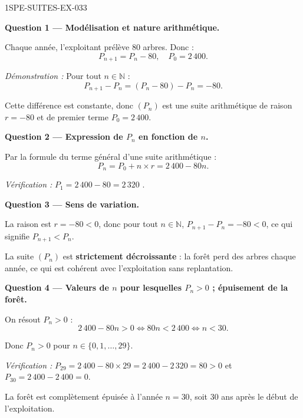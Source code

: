 \begin{corrige}{1SPE-SUITES-EX-033}

\textbf{Question 1 — Modélisation et nature arithmétique.}

Chaque année, l'exploitant prélève $80$ arbres. Donc :
\[
  P_{n+1} = P_n - 80, \quad P_0 = 2\,400.
\]

\textit{Démonstration :} Pour tout $n \in \mathbb{N}$ :
\[
  P_{n+1} - P_n = (P_n - 80) - P_n = -80.
\]


Cette différence est constante, donc $(P_n)$ est une suite arithmétique de raison $r = -80$ et de premier terme $P_0 = 2\,400$.

\medskip
\textbf{Question 2 — Expression de $P_n$ en fonction de $n$.}

Par la formule du terme général d'une suite arithmétique :
\[
  P_n = P_0 + n \times r = 2\,400 - 80n.
\]

\textit{Vérification :} $P_1 = 2\,400 - 80 = 2\,320$ \checkmark.

\medskip
\textbf{Question 3 — Sens de variation.}

La raison est $r = -80 < 0$, donc pour tout $n \in \mathbb{N}$, $P_{n+1} - P_n = -80 < 0$, ce qui signifie $P_{n+1} < P_n$.


La suite $(P_n)$ est \textbf{strictement décroissante} : la forêt perd des arbres chaque année, ce qui est cohérent avec l'exploitation sans replantation.

\medskip
\textbf{Question 4 — Valeurs de $n$ pour lesquelles $P_n > 0$ ; épuisement de la forêt.}

On résout $P_n > 0$ :
\[
  2\,400 - 80n > 0 \iff 80n < 2\,400 \iff n < 30.
\]

Donc $P_n > 0$ pour $n \in \{0, 1, \ldots, 29\}$.

\textit{Vérification :} $P_{29} = 2\,400 - 80 \times 29 = 2\,400 - 2\,320 = 80 > 0$ et $P_{30} = 2\,400 - 2\,400 = 0$. \checkmark


La forêt est complètement épuisée à l'année $n = 30$, soit $30$ ans après le début de l'exploitation.


\end{corrige}
